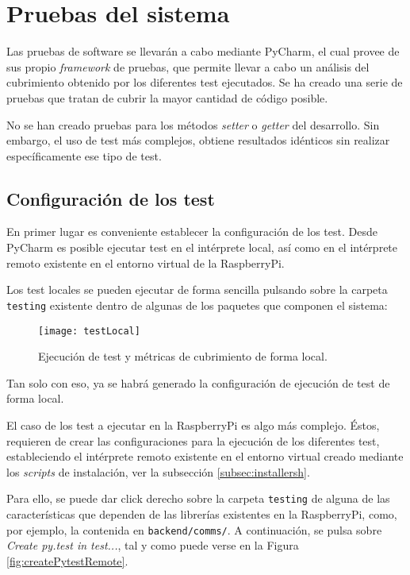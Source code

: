 \section{Pruebas del sistema}

Las pruebas de software se llevarán a cabo mediante PyCharm, el cual provee de sus propio \emph{framework} de pruebas, que permite llevar a cabo un análisis del cubrimiento obtenido por los diferentes test ejecutados. Se ha creado una serie de pruebas que tratan de cubrir la mayor cantidad de código posible. 

No se han creado pruebas para los métodos \emph{setter} o \emph{getter} del desarrollo. Sin embargo, el uso de test más complejos, obtiene resultados idénticos sin realizar específicamente ese tipo de test. 


\subsection{Configuración de los test}
\label{subsec:configtest}
En primer lugar es conveniente establecer la configuración de los test. Desde PyCharm es posible ejecutar test en el intérprete local, así como en el intérprete remoto existente en el entorno virtual de la RaspberryPi. 

Los test locales se pueden ejecutar de forma sencilla pulsando sobre la carpeta \texttt{testing} existente dentro de algunas de los paquetes que componen el sistema: 


\begin{figure}
	\centering
	\texttt{[image: testLocal]}
	\caption[Ejecución de test en intérprete local]{Ejecución de test y métricas de cubrimiento de forma local.}\label{fig:testLocal}
\end{figure}

Tan solo con eso, ya se habrá generado la configuración de ejecución de test de forma local. 

El caso de los test a ejecutar en la RaspberryPi es algo más complejo. Éstos, requieren de crear las configuraciones para la ejecución de los diferentes test, estableciendo el intérprete remoto existente en el entorno virtual creado mediante los \emph{scripts} de instalación, ver la subsección \ref{subsec:installersh}.

Para ello, se puede dar click derecho sobre la carpeta \texttt{testing} de alguna de las características que dependen de las librerías existentes en la RaspberryPi, como, por ejemplo, la contenida en \texttt{backend/comms/}. 
A continuación, se pulsa sobre \emph{Create py.test in test...}, tal y como puede verse en la Figura \ref{fig:createPytestRemote}.

